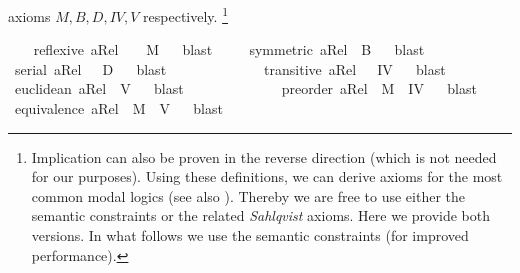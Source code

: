 \begin{isabellebody}
\begin{isamarkuptext}
  axioms $M, B, D, IV, V$ respectively.
  \footnote{Implication can also be proven in the reverse direction (which is not needed for our purposes).
  Using these definitions, we can derive axioms for the most common modal logics (see also \cite{C47}). 
  Thereby we are free to use either the semantic constraints or the related \emph{Sahlqvist} axioms. Here we provide 
  both versions. In what follows we use the semantic constraints (for improved performance).}%
\end{isamarkuptext}\isamarkuptrue%
\ \ \isamarkupfalse%
\ {\isachardoublequoteopen}reflexive\ aRel\ \ {\isasymLongrightarrow}\ \ {\isasymlfloor}M{\isasymrfloor}{\isachardoublequoteclose}%
\ %
%
\isamarkupfalse%
\ blast\ %
%
%
%
\isanewline
\ \ \isamarkupfalse%
\ {\isachardoublequoteopen}symmetric\ aRel\ {\isasymLongrightarrow}\ {\isasymlfloor}B{\isasymrfloor}{\isachardoublequoteclose}%
\ %
%
\isamarkupfalse%
\ blast%
%
%
\isanewline
\ \ \isamarkupfalse%
\ {\isachardoublequoteopen}serial\ aRel\ \ {\isasymLongrightarrow}\ {\isasymlfloor}D{\isasymrfloor}{\isachardoublequoteclose}%
\ %
%
\isamarkupfalse%
\ blast%
%
%
\ \ \ \ \ \ \ \ \ \isanewline
\ \ \isamarkupfalse%
\ {\isachardoublequoteopen}transitive\ aRel\ \ {\isasymLongrightarrow}\ {\isasymlfloor}IV{\isasymrfloor}{\isachardoublequoteclose}%
\ %
%
\isamarkupfalse%
\ blast%
%
%
\ \ \ \isanewline
\ \ \isamarkupfalse%
\ {\isachardoublequoteopen}euclidean\ aRel\ {\isasymLongrightarrow}\ {\isasymlfloor}V{\isasymrfloor}{\isachardoublequoteclose}%
\ %
%
\isamarkupfalse%
\ blast%
%
%
\ \ \ \ \ \ \ \ \ \isanewline
\ \ \isamarkupfalse%
\ {\isachardoublequoteopen}preorder\ aRel\ {\isasymLongrightarrow}\ {\isasymlfloor}M{\isasymrfloor}\ {\isasymand}\ {\isasymlfloor}IV{\isasymrfloor}{\isachardoublequoteclose}%
\ %
%
\isamarkupfalse%
\ blast\ %
%
%
%
\isanewline
\ \ \isamarkupfalse%
\ {\isachardoublequoteopen}equivalence\ aRel\ {\isasymLongrightarrow}\ {\isasymlfloor}M{\isasymrfloor}\ {\isasymand}\ {\isasymlfloor}V{\isasymrfloor}{\isachardoublequoteclose}%
\ %
%
\isamarkupfalse%
\ blast\ %
%
%
%
%
%
%
%
%
%
%
%
%
%
%
%
%
%
%
%
%
%
%
%
%
%
%
%
%
%
%
%
%
%
%
%
%
%
%
%
%
%
%
%
%
%
%
%
%
%
%
%
%
%
%
%
%
%
%
%
%
%
%
%
%
%
%
%
%
%
%
%
%
%
%
%
%
%
%
%
%
%
%
\end{isabellebody}%
